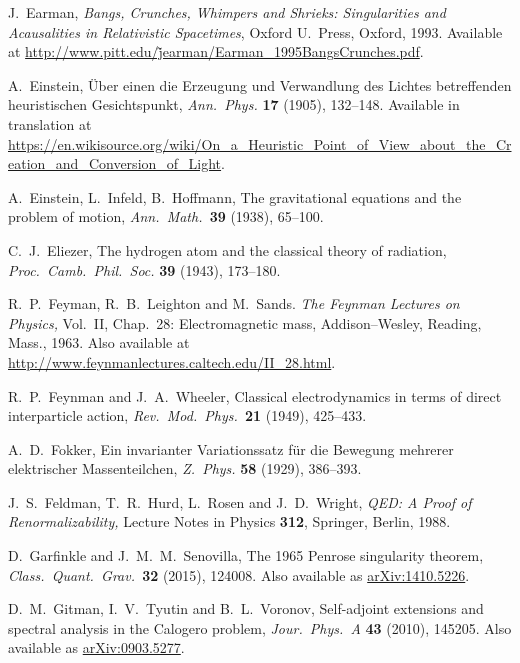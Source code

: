 \documentclass[12pt]{article}
\begin{document}
\begin{thebibliography}{10}
 J.\ Earman, \textsl{Bangs, Crunches, Whimpers and Shrieks: Singularities and Acausalities in Relativistic Spacetimes}, Oxford U.\ Press, Oxford,
1993.  Available at \href{http://www.pitt.edu/~jearman/Earman_1995BangsCrunches.pdf}{http://www.pitt.edu/\~jearman/Earman\_1995BangsCrunches.pdf}.

 A.\ Einstein, \"Uber einen die Erzeugung und Verwandlung des Lichtes betreffenden heuristischen Gesichtspunkt, \textsl{Ann.\ Phys.} \textbf{17} (1905), 132--148.  Available in translation at \href{https://en.wikisource.org/wiki/On_a_Heuristic_Point_of_View_about_the_Creation_and_Conversion_of_Light}{https://en.wikisource.org/wiki/On\_a\_Heuristic\_Point\_of\_View\_about\_the\_\break Creation\_and\_Conversion\_of\_Light}.

 A.\ Einstein, L.\ Infeld, B.\ Hoffmann, The gravitational equations and the problem of motion, \textsl{Ann.\ Math.\ }\textbf{39} (1938), 65--100.

 C.\ J.\ Eliezer, The hydrogen atom and the classical theory of
radiation, \textsl{Proc.\ Camb.\ Phil.\ Soc.} \textbf{39} (1943), 173--180.

 R.\ P.\ Feyman, R.\ B.\ Leighton and M.\ Sands. 
\textsl{The Feynman Lectures on Physics,} Vol.\ II, Chap.\ 28: Electromagnetic mass, Addison--Wesley, Reading, Mass., 1963.  Also available at \href{http://www.feynmanlectures.caltech.edu/II_28.html}
{http://www.feynmanlectures.caltech.edu/II\_28.html}.

 R.\ P.\ Feynman and J.\ A.\ Wheeler, 
Classical electrodynamics in terms of direct interparticle action, \textsl{Rev.\ Mod.\
Phys.\ }\textbf{21} (1949), 425--433.  
 
 A.\ D.\ Fokker, Ein invarianter Variationssatz f\"ur die Bewegung mehrerer elektrischer Massenteilchen, \textsl{Z.\ Phys.} \textbf{58} (1929), 386--393.

 J.\ S.\ Feldman, T.\ R.\ Hurd, L.\ Rosen and J.\ D.\ Wright, \textsl{QED: A Proof of Renormalizability,} Lecture Notes in Physics \textbf{312}, Springer, Berlin, 1988.

 D.\ Garfinkle and J.\ M.\ M.\ Senovilla, The 1965 Penrose singularity theorem, \textsl{Class.\ Quant.\ Grav.\ }\textbf{32} (2015), 124008.  Also available as \href{http://arxiv.org/abs/1410.5226}{arXiv:1410.5226}.

 D.\ M.\ Gitman, I.\ V.\ Tyutin and B.\ L.\ Voronov, Self-adjoint extensions and spectral analysis in the Calogero problem,  \textsl{Jour.\ Phys.\ A} \textbf{43} (2010), 145205. Also available as \href{http://arxiv.org/abs/0903.5277}{arXiv:0903.5277}.


\end{thebibliography}
\end{document}
